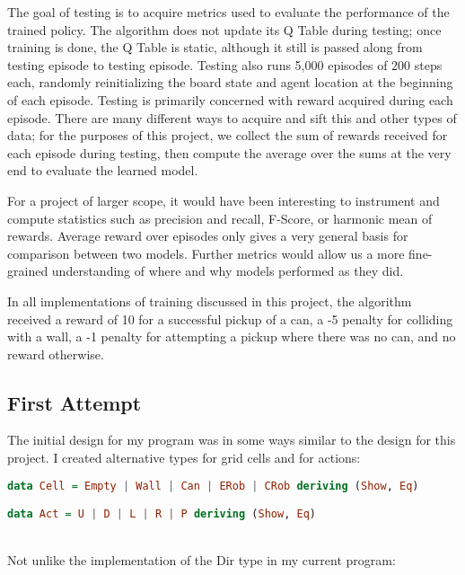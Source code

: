 \documentclass[12pt,a4paper]{article}
\begin{document}
		\par The goal of testing is to acquire metrics used to evaluate the performance of the trained policy. The algorithm does not update its Q Table during testing; once training is done, the Q Table is static, although it still is passed along from testing episode to testing episode. Testing also runs 5,000 episodes of 200 steps each, randomly reinitializing the board state and agent location at the beginning of each episode. Testing is primarily concerned with reward acquired during each episode. There are many different ways to acquire and sift this and other types of data; for the purposes of this project, we collect the sum of rewards received for each episode during testing, then compute the average over the sums at the very end to evaluate the learned model.
		\par For a project of larger scope, it would have been interesting to instrument and compute statistics such as precision and recall, F-Score, or harmonic mean of rewards. Average reward over episodes only gives a very general basis for comparison between two models. Further metrics would allow us a more fine-grained understanding of where and why models performed as they did.
		\par In all implementations of training discussed in this project, the algorithm received a reward of 10 for a successful pickup of a can, a -5 penalty for colliding with a wall, a -1 penalty for attempting a pickup where there was no can, and no reward otherwise.
	
		\subsection{First Attempt}
		
		\par The initial design for my program was in some ways similar to the design for this project. I created alternative types for grid cells and for actions:\\
		
		\begin{lstlisting}[language=Haskell]
data Cell = Empty | Wall | Can | ERob | CRob deriving (Show, Eq)

data Act = U | D | L | R | P deriving (Show, Eq)
		\end{lstlisting}\ \\
		
		 \noindent Not unlike the implementation of the Dir type in my current program:\\
		
\end{document}
